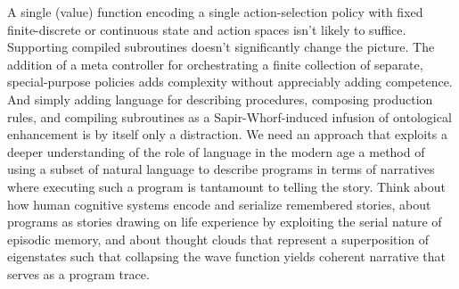 A single  (value) function encoding a single action-selection policy with fixed finite-discrete or continuous state and action spaces isn't likely to suffice. Supporting compiled subroutines doesn't significantly change the picture. The addition of a meta controller for orchestrating a finite collection of separate, special-purpose policies adds complexity without appreciably adding competence. And simply adding language for describing procedures, composing production rules, and compiling subroutines as a Sapir-Whorf-induced infusion of ontological enhancement is \emdash{} by itself \emdash{} only a distraction. We need an approach that exploits a deeper understanding of the role of language in the modern age \emdash{} a method of using a subset of natural language to describe programs in terms of narratives where executing such a program is tantamount to telling the story. Think about how human cognitive systems encode and serialize remembered stories, about programs as stories drawing on life experience by exploiting the serial nature of episodic memory, and about thought clouds that represent a superposition of eigenstates such that collapsing the wave function yields coherent narrative that serves as a program trace.

